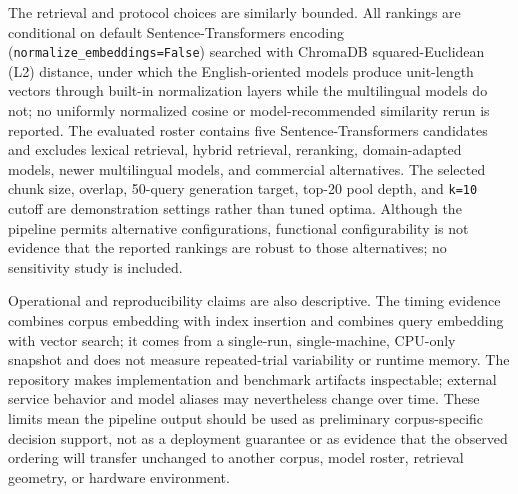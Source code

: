 The retrieval and protocol choices are similarly bounded. All rankings are conditional on default Sentence-Transformers encoding (\texttt{normalize\_embeddings=False}) searched with ChromaDB squared-Euclidean (L2) distance, under which the English-oriented models produce unit-length vectors through built-in normalization layers while the multilingual models do not; no uniformly normalized cosine or model-recommended similarity rerun is reported. The evaluated roster contains five Sentence-Transformers candidates and excludes lexical retrieval, hybrid retrieval, reranking, domain-adapted models, newer multilingual models, and commercial alternatives. The selected chunk size, overlap, 50-query generation target, top-20 pool depth, and \texttt{k=10} cutoff are demonstration settings rather than tuned optima. Although the pipeline permits alternative configurations, functional configurability is not evidence that the reported rankings are robust to those alternatives; no sensitivity study is included.

Operational and reproducibility claims are also descriptive. The timing evidence combines corpus embedding with index insertion and combines query embedding with vector search; it comes from a single-run, single-machine, CPU-only snapshot and does not measure repeated-trial variability or runtime memory. The repository makes implementation and benchmark artifacts inspectable; external service behavior and model aliases may nevertheless change over time. These limits mean the pipeline output should be used as preliminary corpus-specific decision support, not as a deployment guarantee or as evidence that the observed ordering will transfer unchanged to another corpus, model roster, retrieval geometry, or hardware environment.
